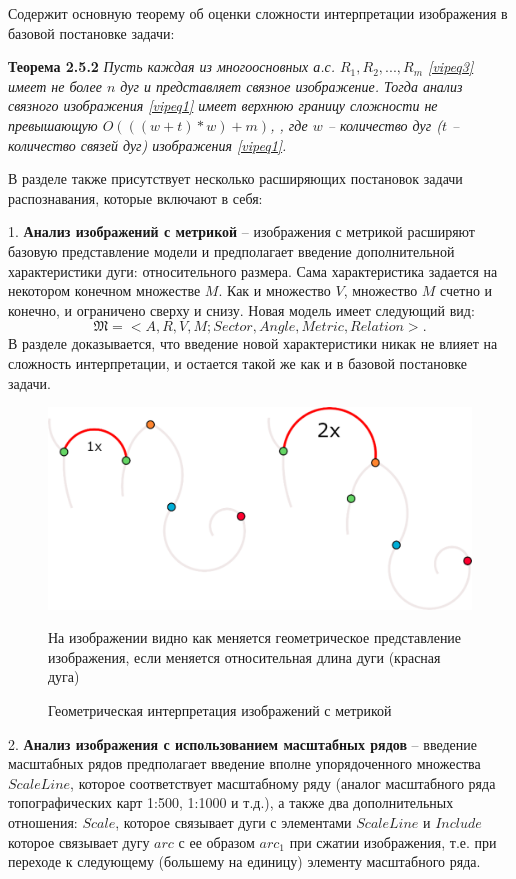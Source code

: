 Содержит основную теорему об оценки сложности интерпретации изображения в базовой постановке задачи:

\medskip
\textbf{Теорема 2.5.2} \textit{Пусть каждая из многоосновных а.с. $R_1, R_2, ..., R_m$  \ref{vipeq3} имеет не  более   $n$   дуг и представляет связное изображение. Тогда анализ  связного изображения \ref{vipeq1} имеет верхнюю границу сложности не превышающую $O(((w + t)*w) + m)$,  , где  $w$ -- количество дуг ($t$ -- количество связей дуг) изображения \ref{vipeq1}.}
\medskip

В разделе также присутствует несколько расширяющих постановок задачи распознавания, которые включают в себя:


1. \textbf{Анализ изображений с метрикой} -- изображения с метрикой расширяют базовую представление модели и предполагает введение дополнительной характеристики дуги: относительного размера. Сама характеристика задается на некотором конечном множестве $M$. Как и множество $V$, множество $M$ счетно и конечно, и ограничено сверху и снизу. Новая модель имеет следующий вид: $$\mathfrak{M}=<A, R, V, M; Sector, Angle, Metric, Relation>.$$ В разделе доказывается, что введение новой характеристики никак не влияет на сложность интерпретации, и остается такой же как и в базовой постановке задачи. 

\begin{figure}[h]
\centering
\includegraphics[width=0.85\linewidth,keepaspectratio]{images/metrics}
\caption{Геометрическая интерпретация изображений с метрикой}
\medskip
\small
На изображении видно как меняется геометрическое представление изображения, если меняется относительная длина дуги (красная дуга)
\end{figure}

2. \textbf{Анализ изображения с использованием масштабных рядов} -- введение масштабных рядов предполагает введение вполне упорядоченного множества $ScaleLine$, которое соответствует масштабному ряду (аналог масштабного ряда топографических карт 1:500,  1:1000 и т.д.), а также два дополнительных отношения: $Scale$,  которое связывает дуги с элементами $ScaleLine$ и $Include$ которое связывает дугу $arc$ с ее образом $arc_1$ при сжатии изображения, т.е. при переходе к следующему (большему на единицу) элементу масштабного ряда.

